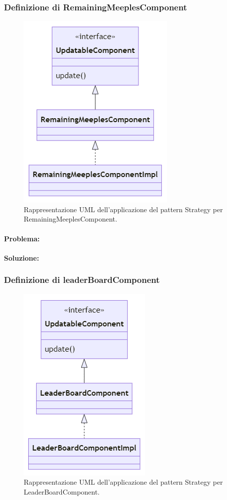 \subsubsection*{Definizione di RemainingMeeplesComponent}
\begin{figure}[ht]
    \centering\includegraphics[]{images/RemainingMeeplesComponent_uml.png}
    \caption{Rappresentazione UML dell'applicazione del pattern Strategy per RemainingMeeplesComponent.}
\end{figure}
\paragraph{Problema:}
\paragraph{Soluzione:}


\subsubsection*{Definizione di leaderBoardComponent}
\begin{figure}[ht]
    \centering\includegraphics[]{images/LeaderBoard_uml.png}
    \caption{Rappresentazione UML dell'applicazione del pattern Strategy per LeaderBoardComponent.}
\end{figure}
